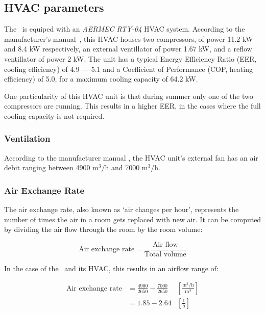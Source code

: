 \subsection{HVAC parameters}\label{sec:HVAC_parameters}

The \pdome\ is equiped with an \textit{AERMEC RTY-04} HVAC system. According to
the manufacturer's manual~\cite{aermecRoofTopManuelSelection}, this HVAC houses
two compressors, of power 11.2 kW and 8.4 kW respectively, an external
ventillator of power 1.67 kW, and a reflow ventillator of power 2 kW. The unit
has a typical Energy Efficiency Ratio (EER, cooling efficiency) of 4.9 --- 5.1
and a Coefficient of Performance (COP, heating efficiency) of 5.0, for a maximum
cooling capacity of 64.2 kW. 

One particularity of this HVAC unit is that during summer only one of the two
compressors are running. This results in a higher EER, in the cases where the
full cooling capacity is not required.

\subsubsection*{Ventilation}

According to the manufacturer manual \cite{aermecRoofTopManuelSelection}, the
HVAC unit's external fan has an air debit ranging between 4900
$\text{m}^3/\text{h}$ and 7000 $\text{m}^3/\text{h}$.

\subsubsection*{Air Exchange Rate}\label{sec:Air_Exchange_Rate}

The air exchange rate, also known as `air changes per hour', represents the
number of times the air in a room gets replaced with new air. It can be
computed by dividing the air flow through the room by the room volume:

\begin{equation}
    \text{Air exchange rate} = \frac{\text{Air flow}}{\text{Total volume}}
\end{equation}

In the case of the \pdome\ and its HVAC, this results in an airflow range of:

\begin{equation}
    \begin{aligned}
        \text{Air exchange rate} &= \frac{4900}{2650} 
        - \frac{7000}{2650} &\left[\frac{\text{m}^3/\text{h}}{\text{m}^3}\right]\\
                            &= 1.85 - 2.64 &\left[\frac{1}{\text{h}}\right]
    \end{aligned}
\end{equation}


